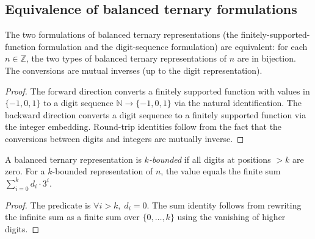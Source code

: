 \subsection{Equivalence of balanced ternary formulations}

\begin{lemma}
\label{lem.fps.laure.bt-equiv}
\leanhelper
\leanok
The two formulations of balanced ternary representations
(the finitely-supported-function formulation and
the digit-sequence formulation) are equivalent:
for each $n \in \mathbb{Z}$, the two types of balanced ternary
representations of $n$ are in bijection.
The conversions are mutual inverses (up to the digit representation).
\end{lemma}

\begin{proof}
The forward direction converts a finitely supported function with values in
$\{-1, 0, 1\}$ to a digit sequence $\mathbb{N} \to \{-1, 0, 1\}$
via the natural identification.
The backward direction converts a digit sequence
to a finitely supported function via the integer embedding.
Round-trip identities follow from the fact that the conversions between
digits and integers are mutually inverse.
\end{proof}

\begin{lemma}
\label{lem.fps.laure.bt-bounded-helpers}
\leanhelper
\leanok
A balanced ternary representation is \emph{$k$-bounded} if all digits
at positions $> k$ are zero.
For a $k$-bounded representation of $n$, the value equals the finite sum
$\sum_{i=0}^{k} d_i \cdot 3^i$.
\end{lemma}

\begin{proof}
\leanok
The predicate is $\forall i > k,\; d_i = 0$. The sum identity
follows from rewriting the infinite sum as a finite sum over
$\{0, \ldots, k\}$ using the vanishing of higher digits.
\end{proof}
